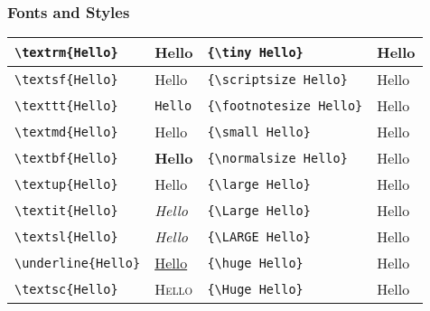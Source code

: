 \begin{frame}[fragile]
\frametitle{Fonts and Styles}
\begin{tabular}[c]{|l l|l l|}
\hline
\verb!\textrm{Hello}! & \textrm{Hello} & \verb!{\tiny Hello}! & {\tiny Hello} \\
\hline
\verb!\textsf{Hello}! & \textsf{Hello} & \verb!{\scriptsize Hello}! & {\scriptsize Hello} \\
\hline
\verb!\texttt{Hello}! & \texttt{Hello} & \verb!{\footnotesize Hello}! & {\footnotesize Hello} \\
\hline
\verb!\textmd{Hello}! & \textmd{Hello} & \verb!{\small Hello}! & {\small Hello} \\
\hline
\verb!\textbf{Hello}! & \textbf{Hello} & \verb!{\normalsize Hello}! & {\normalsize Hello} \\
\hline
\verb!\textup{Hello}! & \textup{Hello} & \verb!{\large Hello}! & {\large Hello} \\
\hline
\verb!\textit{Hello}! & \textit{Hello} & \verb!{\Large Hello}! & {\Large Hello} \\
\hline
\verb!\textsl{Hello}! & \textsl{Hello} & \verb!{\LARGE Hello}! & {\LARGE Hello} \\
\hline
\verb!\underline{Hello}! & \underline{Hello} & \verb!{\huge Hello}! & {\huge Hello} \\
\hline
\verb!\textsc{Hello}! & \textsc{Hello} & \verb!{\Huge Hello}! & {\Huge Hello} \\
\hline
\end{tabular}
\end{frame}
        
